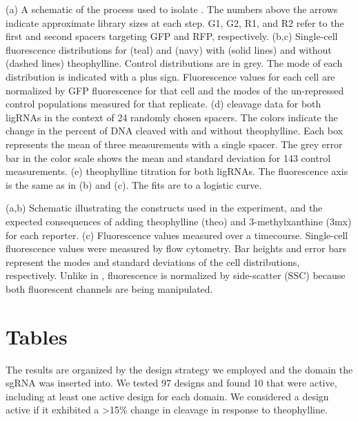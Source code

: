 \documentclass[10pt,oneside]{article}
\begin{document}


 (a) A schematic of the process used to isolate \ligrnaF{}.  The numbers above the arrows indicate approximate library sizes at each step.  G1, G2, R1, and R2 refer to the first and second spacers targeting GFP and RFP, respectively.
 (b,c) Single-cell fluorescence distributions for \ligrnaF{} (teal) and \ligrnaB{} (navy) with (solid lines) and without (dashed lines) theophylline.  Control distributions are in grey.  The mode of each distribution is indicated with a plus sign.  Fluorescence values for each cell are normalized by GFP fluorescence for that cell and the modes of the un-repressed control populations measured for that replicate.
 (d) \Invitro{} cleavage data for both ligRNAs in the context of 24 randomly chosen spacers.  The colors indicate the change in the percent of DNA cleaved with and without theophylline.  Each box represents the mean of three measurements with a single spacer.   The grey error bar in the color scale shows the mean and standard deviation for 143 control measurements.
 (e) \Invivo{} theophylline titration for both ligRNAs.  The fluorescence axis is the same as in (b) and (c).  The fits are to a logistic curve.
 



 (a,b) Schematic illustrating the constructs used in the experiment, and the expected consequences of adding theophylline (theo) and 3-methylxanthine (3mx) for each reporter.
 (c) Fluorescence values measured over a  timecourse.  Single-cell fluorescence values were measured by flow cytometry.  Bar heights and error bars represent the modes and standard deviations of the cell distributions, respectively.  Unlike in , fluorescence is normalized by side-scatter (SSC) because both fluorescent channels are being manipulated.

\section{Tables}



   The results are organized by the design strategy we employed and the domain the sgRNA was inserted into.  We tested 97 designs and found 10 that were active, including at least one active design for each domain.  We considered a design active if it exhibited a >15\% change in cleavage in response to theophylline. 
\end{document}
